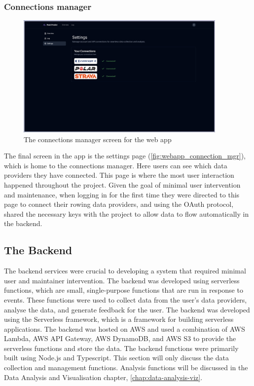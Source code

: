 \subsubsection{Connections manager}

\begin{figure}[htbp]
  \centering
  \includegraphics[height=6cm]{figures/fyp_connections_page.jpeg}
  \captionsetup{justification=centering}
  \caption[Web app Connections Manager]{\label{fig:webapp_connection_mgr}The connections manager screen for the web app} 
\end{figure}
The final screen in the app is the settings page (\autoref{fig:webapp_connection_mgr}), which is home to the connections manager. Here users can see which data providers they have connected. This page is where the most user interaction happened throughout the project. Given the goal of minimal user intervention and maintenance, when logging in for the first time they were directed to this page to connect their rowing data providers, and using the OAuth protocol, shared the necessary keys with the project to allow data to flow automatically in the backend.  

\subsection{The Backend}
The backend services were crucial to developing a system that required minimal user and maintainer intervention. The backend was developed using serverless functions, which are small, single-purpose functions that are run in response to events. These functions were used to collect data from the user's data providers, analyse the data, and generate feedback for the user. The backend was developed using the Serverless framework, which is a framework for building serverless applications. The backend was hosted on AWS and used a combination of AWS Lambda, AWS API Gateway, AWS DynamoDB, and AWS S3 to provide the serverless functions and store the data. The backend functions were primarily built using Node.js and Typescript. This section will only discuss the data collection and management functions. Analysis functions will be discussed in the Data Analysis and Visualisation chapter, \autoref{chap:data-analysis-viz}.

